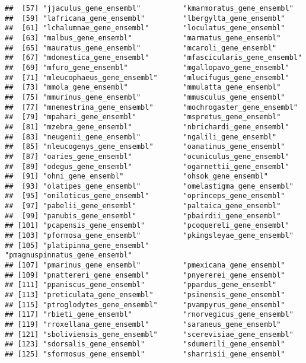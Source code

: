 \documentclass{article}\usepackage[]{graphicx}\usepackage[]{color}
\makeatletter
\newenvironment{kframe}{%
 \def\at@end@of@kframe{}%
 \ifinner\ifhmode%
  \def\at@end@of@kframe{\end{minipage}}%
  \begin{minipage}{\columnwidth}%
 \fi\fi%
 \def\FrameCommand##1{\hskip\@totalleftmargin \hskip-\fboxsep
 \colorbox{shadecolor}{##1}\hskip-\fboxsep
     \hskip-\linewidth \hskip-\@totalleftmargin \hskip\columnwidth}%
 \MakeFramed {\advance\hsize-\width
   \@totalleftmargin\z@ \linewidth\hsize
   \@setminipage}}%
 {\par\unskip\endMakeFramed%
 \at@end@of@kframe}
\newenvironment{knitrout}{}{} %
\makeatother
\begin{document}
\begin{knitrout}
\begin{kframe}
\begin{verbatim}
##  [57] "jjaculus_gene_ensembl"          "kmarmoratus_gene_ensembl"      
##  [59] "lafricana_gene_ensembl"         "lbergylta_gene_ensembl"        
##  [61] "lchalumnae_gene_ensembl"        "loculatus_gene_ensembl"        
##  [63] "malbus_gene_ensembl"            "marmatus_gene_ensembl"         
##  [65] "mauratus_gene_ensembl"          "mcaroli_gene_ensembl"          
##  [67] "mdomestica_gene_ensembl"        "mfascicularis_gene_ensembl"    
##  [69] "mfuro_gene_ensembl"             "mgallopavo_gene_ensembl"       
##  [71] "mleucophaeus_gene_ensembl"      "mlucifugus_gene_ensembl"       
##  [73] "mmola_gene_ensembl"             "mmulatta_gene_ensembl"         
##  [75] "mmurinus_gene_ensembl"          "mmusculus_gene_ensembl"        
##  [77] "mnemestrina_gene_ensembl"       "mochrogaster_gene_ensembl"     
##  [79] "mpahari_gene_ensembl"           "mspretus_gene_ensembl"         
##  [81] "mzebra_gene_ensembl"            "nbrichardi_gene_ensembl"       
##  [83] "neugenii_gene_ensembl"          "ngalili_gene_ensembl"          
##  [85] "nleucogenys_gene_ensembl"       "oanatinus_gene_ensembl"        
##  [87] "oaries_gene_ensembl"            "ocuniculus_gene_ensembl"       
##  [89] "odegus_gene_ensembl"            "ogarnettii_gene_ensembl"       
##  [91] "ohni_gene_ensembl"              "ohsok_gene_ensembl"            
##  [93] "olatipes_gene_ensembl"          "omelastigma_gene_ensembl"      
##  [95] "oniloticus_gene_ensembl"        "oprinceps_gene_ensembl"        
##  [97] "pabelii_gene_ensembl"           "paltaica_gene_ensembl"         
##  [99] "panubis_gene_ensembl"           "pbairdii_gene_ensembl"         
## [101] "pcapensis_gene_ensembl"         "pcoquereli_gene_ensembl"       
## [103] "pformosa_gene_ensembl"          "pkingsleyae_gene_ensembl"      
## [105] "platipinna_gene_ensembl"        "pmagnuspinnatus_gene_ensembl"  
## [107] "pmarinus_gene_ensembl"          "pmexicana_gene_ensembl"        
## [109] "pnattereri_gene_ensembl"        "pnyererei_gene_ensembl"        
## [111] "ppaniscus_gene_ensembl"         "ppardus_gene_ensembl"          
## [113] "preticulata_gene_ensembl"       "psinensis_gene_ensembl"        
## [115] "ptroglodytes_gene_ensembl"      "pvampyrus_gene_ensembl"        
## [117] "rbieti_gene_ensembl"            "rnorvegicus_gene_ensembl"      
## [119] "rroxellana_gene_ensembl"        "saraneus_gene_ensembl"         
## [121] "sboliviensis_gene_ensembl"      "scerevisiae_gene_ensembl"      
## [123] "sdorsalis_gene_ensembl"         "sdumerili_gene_ensembl"        
## [125] "sformosus_gene_ensembl"         "sharrisii_gene_ensembl"        

\end{verbatim}
\end{kframe}
\end{knitrout}
\end{document}

